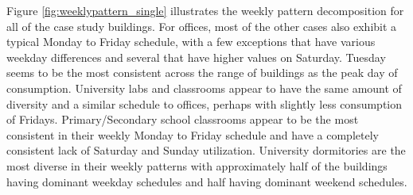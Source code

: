 Figure \ref{fig:weeklypattern_single} illustrates the weekly pattern decomposition for all of the case study buildings. For offices, most of the other cases also exhibit a typical Monday to Friday schedule, with a few exceptions that have various weekday differences and several that have higher values on Saturday. Tuesday seems to be the most consistent across the range of buildings as the peak day of consumption. University labs and classrooms appear to have the same amount of diversity and a similar schedule to offices, perhaps with slightly less consumption of Fridays. Primary/Secondary school classrooms appear to be the most consistent in their weekly Monday to Friday schedule and have a completely consistent lack of Saturday and Sunday utilization. University dormitories are the most diverse in their weekly patterns with approximately half of the buildings having dominant weekday schedules and half having dominant weekend schedules.